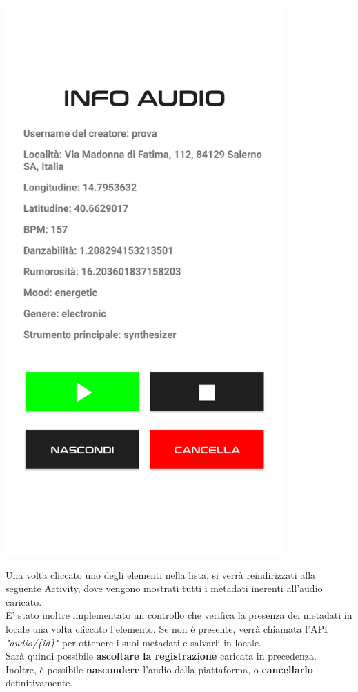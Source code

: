 \documentclass{article}
\begin{document}
\begin{minipage}[t]{0.35\textwidth}
    \centering
    \vspace*{0pt}
    \includegraphics[width=0.8\textwidth]{myaudiodata.png}
\end{minipage}
\hfill
\begin{minipage}[t]{0.6\textwidth}
    \raggedright
    \vspace*{40pt}
    Una volta cliccato uno degli elementi nella lista, si verrà reindirizzati alla seguente Activity, dove vengono mostrati tutti i metadati inerenti all'audio caricato.\\
    E' stato inoltre implementato un controllo che verifica la presenza dei metadati in locale una volta cliccato l'elemento. Se non è presente, verrà chiamata l'API \textit{"audio/\{id\}"} per ottenere i suoi metadati e salvarli in locale.\\
    Sarà quindi possibile \textbf{ascoltare la registrazione} caricata in precedenza.\\
    Inoltre, è possibile \textbf{nascondere} l'audio dalla piattaforma, o \textbf{cancellarlo} definitivamente.
\end{minipage}
\end{document}
